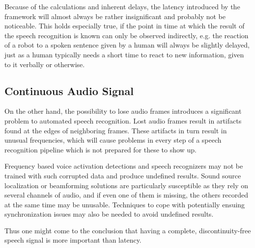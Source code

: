 Because of the calculations and inherent delays, the latency introduced by the framework will almost always be rather insignificant and probably not be noticeable. 
This holds especially true, if the point in time at which the result of the speech recognition is known can only be observed indirectly, e.g. the reaction of a robot to a spoken sentence given by a human will always be slightly delayed, just as a human typically needs a short time to react to new information, given to it verbally or otherwise.

\subsection{Continuous Audio Signal}
On the other hand, the possibility to lose audio frames introduces a significant problem to automated speech recognition.
Lost audio frames result in artifacts found at the edges of neighboring frames. 
These artifacts in turn result in unusual frequencies, which will cause problems in every step of a speech recognition pipeline which is not prepared for these to show up. 

Frequency based voice activation detections and speech recognizers may not be trained with such corrupted data and produce undefined results.
Sound source localization or beamforming solutions are particularly susceptible as they rely on several channels of audio, and if even one of them is missing, the others recorded at the same time may be unusable.
Techniques to cope with potentially ensuing synchronization issues may also be needed to avoid undefined results.
	
Thus one might come to the conclusion that having a complete, discontinuity-free speech signal is more important than latency. 